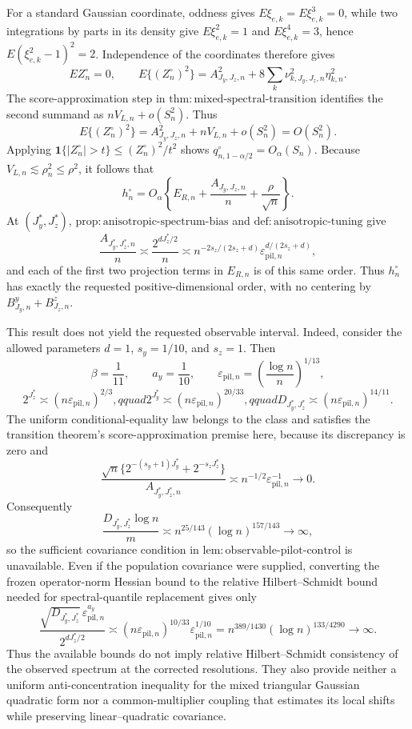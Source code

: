 For a standard Gaussian coordinate, oddness gives \(E\xi_{e,k}=E\xi_{e,k}^3=0\), while two integrations by parts in its density give \(E\xi_{e,k}^2=1\) and \(E\xi_{e,k}^4=3\), hence \(E(\xi_{e,k}^2-1)^2=2\).  Independence of the coordinates therefore gives
\[
E Z_n^\circ=0,\qquad
E\{(Z_n^\circ)^2\}
=A_{J_y,J_z,n}^2+8\sum_k\nu_{k,J_y,J_z,n}^2\eta_{k,n}^2.
\]
The score-approximation step in \(\mathrm{thm{:}mixed\text{-}spectral\text{-}transition}\) identifies the second summand as \(nV_{L,n}+o(S_n^2)\).  Thus
\[
E\{(Z_n^\circ)^2\}=A_{J_y,J_z,n}^2+nV_{L,n}+o(S_n^2)=O(S_n^2).
\]
Applying \(\mathbf 1\{|Z_n^\circ|>t\}\le (Z_n^\circ)^2/t^2\) shows
\(q_{n,1-\alpha/2}^\circ=O_\alpha(S_n)\).  Because \(V_{L,n}\lesssim\rho_n^2\le\rho^2\), it follows that
\[
h_n^\circ
=O_\alpha\!\left\{
E_{R,n}+\frac{A_{J_y,J_z,n}}n+\frac{\rho}{\sqrt n}
\right\}.
\]
At \((J_y^*,J_z^*)\), \(\mathrm{prop{:}anisotropic\text{-}spectrum\text{-}bias}\) and \(\mathrm{def{:}anisotropic\text{-}tuning}\) give
\[
\frac{A_{J_y^*,J_z^*,n}}n
\asymp\frac{2^{dJ_z^*/2}}n
\asymp n^{-2s_z/(2s_z+d)}
\varepsilon_{\mathrm{pil},n}^{d/(2s_z+d)},
\]
and each of the first two projection terms in \(E_{R,n}\) is of this same order.  Thus \(h_n^\circ\) has exactly the requested positive-dimensional order, with no centering by \(B^y_{J_y,n}+B^z_{J_z,n}\).

This result does not yield the requested observable interval.  Indeed, consider the allowed parameters \(d=1\), \(s_y=1/10\), and \(s_z=1\).  Then
\[
\beta=\frac1{11},\qquad a_y=\frac1{10},\qquad
\varepsilon_{\mathrm{pil},n}=\left(\frac{\log n}{n}\right)^{1/13},
\]
\[
2^{J_z^*}\asymp(n\varepsilon_{\mathrm{pil},n})^{2/3},qquad
2^{J_y^*}\asymp(n\varepsilon_{\mathrm{pil},n})^{20/33},qquad
D_{J_y^*,J_z^*}\asymp(n\varepsilon_{\mathrm{pil},n})^{14/11}.
\]
The uniform conditional-equality law belongs to the class and satisfies the transition theorem's score-approximation premise here, because its discrepancy is zero and
\[
\frac{\sqrt n\{2^{-(s_y+1)J_y^*}+2^{-s_zJ_z^*}\}}
{A_{J_y^*,J_z^*,n}}
\asymp n^{-1/2}\varepsilon_{\mathrm{pil},n}^{-1}\longrightarrow0.
\]
Consequently
\[
\frac{D_{J_y^*,J_z^*}\log n}{m}
\asymp n^{25/143}(\log n)^{157/143}\longrightarrow\infty,
\]
so the sufficient covariance condition in \(\mathrm{lem{:}observable\text{-}pilot\text{-}control}\) is unavailable.  Even if the population covariance were supplied, converting the frozen operator-norm Hessian bound to the relative Hilbert--Schmidt bound needed for spectral-quantile replacement gives only
\[
\frac{\sqrt{D_{J_y^*,J_z^*}}\,
\varepsilon_{\mathrm{pil},n}^{a_y}}
{2^{dJ_z^*/2}}
\asymp
(n\varepsilon_{\mathrm{pil},n})^{10/33}
\varepsilon_{\mathrm{pil},n}^{1/10}
=n^{389/1430}(\log n)^{133/4290}\longrightarrow\infty.
\]
Thus the available bounds do not imply relative Hilbert--Schmidt consistency of the observed spectrum at the corrected resolutions.  They also provide neither a uniform anti-concentration inequality for the mixed triangular Gaussian quadratic form nor a common-multiplier coupling that estimates its local shifts while preserving linear--quadratic covariance.

